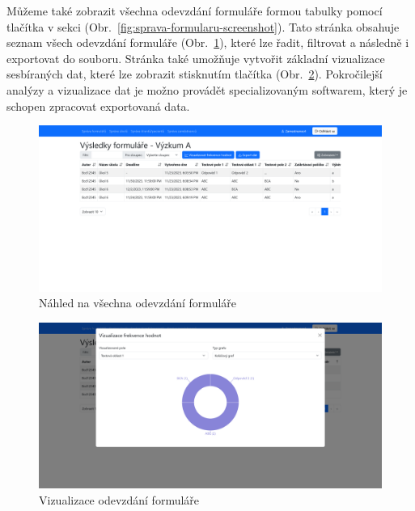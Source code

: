Můžeme také zobrazit všechna odevzdání formuláře formou tabulky pomocí tlačítka  v sekci  (Obr.\ \ref{fig:sprava-formularu-screenshot}).
Tato stránka obsahuje seznam všech odevzdání formuláře (Obr.\ \ref{fig:nahled-vsechna-odevzdani-zamestnanec-screenshot}), které lze řadit, filtrovat a následně i exportovat do souboru.
Stránka také umožňuje vytvořit základní vizualizace sesbíraných dat, které lze zobrazit stisknutím tlačítka  (Obr.\ \ref{fig:nahled-vsechna-odevzdani-vizualizace-zamestnanec-screenshot}).
Pokročilejší analýzy a vizualizace dat je možno provádět specializovaným softwarem, který je schopen zpracovat exportovaná data.

\begin{figure}[H]
    \includegraphics[width=\textwidth]{../img/screenshots/vysledky-formulare}
    \caption{Náhled na všechna odevzdání formuláře}\label{fig:nahled-vsechna-odevzdani-zamestnanec-screenshot}
\end{figure}

\begin{figure}[H]
    \includegraphics[width=\textwidth]{../img/screenshots/vysledky-formulare-vizualizace}
    \caption{Vizualizace odevzdání formuláře}\label{fig:nahled-vsechna-odevzdani-vizualizace-zamestnanec-screenshot}
\end{figure}

